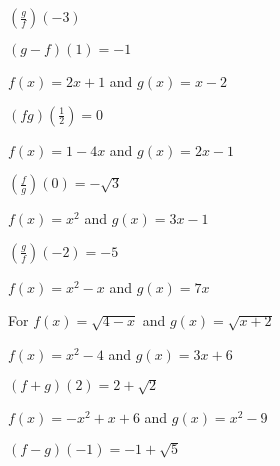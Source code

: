 \documentclass{ximera}
\begin{document}
\begin{question}
$\left(\frac{g}{f}\right)(-3)$ 

\begin{solution}
$(g-f)(1) = -1$

\end{solution}

\end{question}

\begin{question}
$f(x) = 2x+1$ and $g(x) = x-2$
\begin{solution}
$(fg)\left(\frac{1}{2}\right) = 0$
\end{solution}

\end{question}

\begin{question}
$f(x) = 1-4x$ and $g(x) = 2x-1$

\begin{solution}
$\left(\frac{f}{g}\right)(0) = -\sqrt{3}$
\end{solution}

\end{question}

\begin{question}
$f(x) = x^2$ and $g(x) = 3x-1$
\begin{solution}
$\left(\frac{g}{f}\right)\left(-2\right) = -5$

\end{solution}

\end{question}

\begin{question}
$f(x) = x^2-x$ and $g(x) = 7x$

\begin{solution}
For $f(x) = \sqrt{4-x}$ and $g(x) = \sqrt{x+2}$


\end{solution}

\end{question}

\begin{question}
$f(x) = x^2-4$ and $g(x) = 3x+6$
\begin{solution}
$(f+g)(2) = 2+\sqrt{2}$
\end{solution}

\end{question}

\begin{question}
$f(x) = -x^2+x+6$ and $g(x) = x^2-9$

\begin{solution}
$(f-g)(-1) = -1+\sqrt{5}$
\end{solution}

\end{question}
\end{document}
